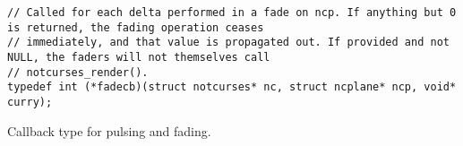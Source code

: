 \begin{listing}[!htb]
\begin{verbatim}
// Called for each delta performed in a fade on ncp. If anything but 0 is returned, the fading operation ceases
// immediately, and that value is propagated out. If provided and not NULL, the faders will not themselves call
// notcurses_render().
typedef int (*fadecb)(struct notcurses* nc, struct ncplane* ncp, void* curry);
\end{verbatim}
\caption{Callback type for pulsing and fading.}
\label{list:fadecb}
\end{listing}

